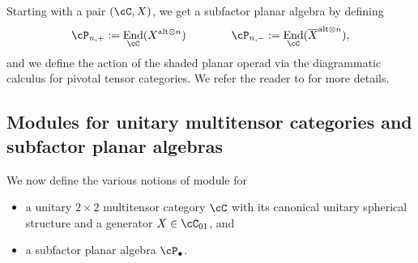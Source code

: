 \documentclass[11pt]{article}
\theoremstyle{plain}
\theoremstyle{definition}
\DeclareMathOperator{\End}{End}
\begin{document}
Starting with a pair $(\cC, X)$, we get a subfactor planar algebra by defining
$$
\cP_{n,+} := \End_\cC(X^{ \text{alt} \otimes n})
\qquad\qquad
\cP_{n,-} := \End_\cC(\overline{X}^{ \text{alt} \otimes n}),
$$
and we define the action of the shaded planar operad via the diagrammatic calculus for pivotal tensor categories.
We refer the reader to \cite{MR2811311,1808.00323} for more details.

\subsection{Modules for unitary multitensor categories and subfactor planar algebras}
\label{ssec:moduledefs}
\label{sec:3TypesOfModules}

We now define the various notions of module for 
\begin{itemize}
\item
a unitary $2\times 2$ multitensor category $\cC$ with its canonical unitary spherical structure and a generator $X\in \cC_{01}$,
and
\item
a subfactor planar algebra $\cP_\bullet$.
\end{itemize}
\end{document}
